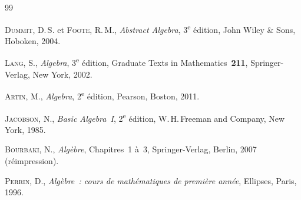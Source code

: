 \documentclass[12pt,a4paper,openany]{book}
\theoremstyle{definition}
\begin{document}

\begin{thebibliography}{99}

\textsc{Dummit}, D.\,S. et \textsc{Foote}, R.\,M.,
\emph{Abstract Algebra}, 3\textsuperscript{e} édition,
John Wiley \& Sons, Hoboken, 2004.

\textsc{Lang}, S.,
\emph{Algebra}, 3\textsuperscript{e} édition,
Graduate Texts in Mathematics~\textbf{211},
Springer-Verlag, New York, 2002.

\textsc{Artin}, M.,
\emph{Algebra}, 2\textsuperscript{e} édition,
Pearson, Boston, 2011.

\textsc{Jacobson}, N.,
\emph{Basic Algebra~I}, 2\textsuperscript{e} édition,
W.\,H.\,Freeman and Company, New York, 1985.

\textsc{Bourbaki}, N.,
\emph{Algèbre}, Chapitres~1 à~3,
Springer-Verlag, Berlin, 2007 (réimpression).

\textsc{Perrin}, D.,
\emph{Algèbre~: cours de mathématiques de première année},
Ellipses, Paris, 1996.

\end{thebibliography}


\printindex
\end{document}
